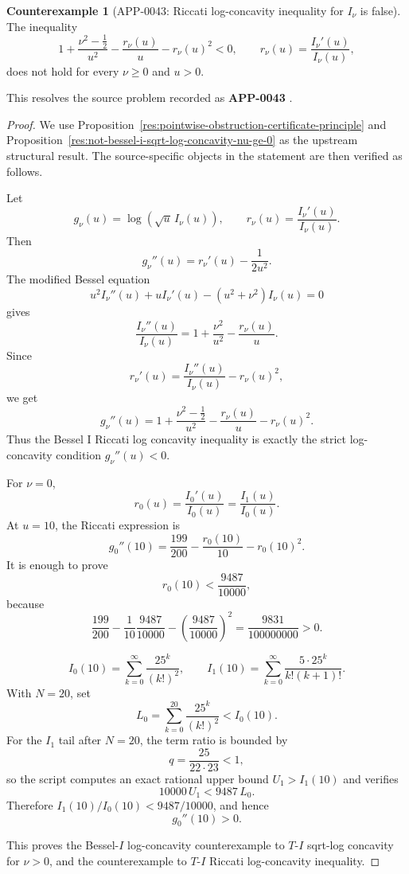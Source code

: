 \documentclass[11pt]{article}
\numberwithin{equation}{section}
\theoremstyle{definition}
\newtheorem{counterexample}[theorem]{Counterexample}
\theoremstyle{remark}
\newcommand{\1}{\mathbf 1}
\begin{document}
\begin{counterexample}[APP-0043: Riccati log-concavity inequality for \(I_\nu\) is false]
\label{res:not-bessel-i-riccati-log-concavity-inequality}
The inequality
\[
1+\frac{\nu^2-\frac12}{u^2}-\frac{r_\nu(u)}{u}-r_\nu(u)^2<0,
\qquad r_\nu(u)=\frac{I_\nu'(u)}{I_\nu(u)},
\]
does not hold for every \(\nu\ge0\) and \(u>0\).



This resolves the source problem recorded as \textbf{APP-0043} \cite{app-app-0042-source}.
\end{counterexample}

\begin{proof}
We use Proposition~\ref{res:pointwise-obstruction-certificate-principle} and Proposition~\ref{res:not-bessel-i-sqrt-log-concavity-nu-ge-0} as the upstream structural result. The source-specific objects in the statement are then verified as follows.

Let
\[
g_\nu(u)=\log(\sqrt u\,I_\nu(u)),
\qquad
r_\nu(u)=\frac{I_\nu'(u)}{I_\nu(u)}.
\]
Then
\[
g_\nu''(u)=r_\nu'(u)-\frac{1}{2u^2}.
\]
The modified Bessel equation
\[
u^2I_\nu''(u)+uI_\nu'(u)-(u^2+\nu^2)I_\nu(u)=0
\]
gives
\[
\frac{I_\nu''(u)}{I_\nu(u)}
=1+\frac{\nu^2}{u^2}-\frac{r_\nu(u)}{u}.
\]
Since
\[
r_\nu'(u)=\frac{I_\nu''(u)}{I_\nu(u)}-r_\nu(u)^2,
\]
we get
\[
g_\nu''(u)
=
1+\frac{\nu^2-\frac12}{u^2}
-\frac{r_\nu(u)}{u}
-r_\nu(u)^2.
\]
Thus the Bessel I Riccati log concavity inequality is exactly the strict log-concavity condition \(g_\nu''(u)<0\).

For \(\nu=0\),
\[
r_0(u)=\frac{I_0'(u)}{I_0(u)}=\frac{I_1(u)}{I_0(u)}.
\]
At \(u=10\), the Riccati expression is
\[
g_0''(10)=\frac{199}{200}-\frac{r_0(10)}{10}-r_0(10)^2.
\]
It is enough to prove
\[
r_0(10)<\frac{9487}{10000},
\]
because
\[
\frac{199}{200}
-\frac{1}{10}\frac{9487}{10000}
-\left(\frac{9487}{10000}\right)^2
=\frac{9831}{100000000}>0.
\]

\[
I_0(10)=\sum_{k=0}^{\infty}\frac{25^k}{(k!)^2},
\qquad
I_1(10)=\sum_{k=0}^{\infty}\frac{5\cdot25^k}{k!(k+1)!}.
\]
With \(N=20\), set
\[
L_0=\sum_{k=0}^{20}\frac{25^k}{(k!)^2}<I_0(10).
\]
For the \(I_1\) tail after \(N=20\), the term ratio is bounded by
\[
q=\frac{25}{22\cdot23}<1,
\]
so the script computes an exact rational upper bound \(U_1>I_1(10)\) and verifies
\[
10000\,U_1<9487\,L_0.
\]
Therefore \(I_1(10)/I_0(10)<9487/10000\), and hence
\[
g_0''(10)>0.
\]

This proves the Bessel-\(I\) log-concavity counterexample to \(T\)-\(I\) sqrt-log concavity for \(\nu>0\), and the counterexample to \(T\)-\(I\) Riccati log-concavity inequality.
\end{proof}
\end{document}

